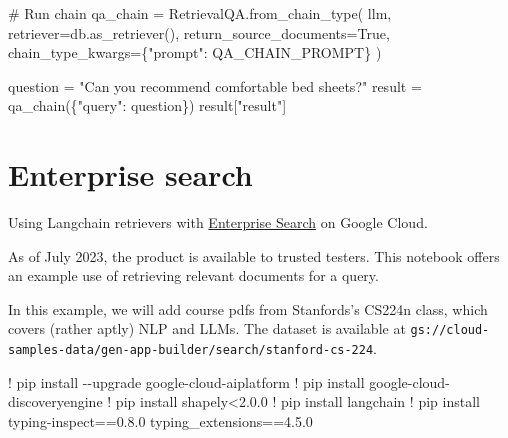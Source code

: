 \documentclass[
  letterpaper,
  DIV=11,
  numbers=noendperiod]{scrreprt}
\newenvironment{Shaded}{\begin{snugshade}}{\end{snugshade}}
\newcommand{\CommentTok}[1]{\textcolor[rgb]{0.37,0.37,0.37}{#1}}
\newcommand{\FloatTok}[1]{\textcolor[rgb]{0.68,0.00,0.00}{#1}}
\newcommand{\NormalTok}[1]{\textcolor[rgb]{0.00,0.23,0.31}{#1}}
\newcommand{\OperatorTok}[1]{\textcolor[rgb]{0.37,0.37,0.37}{#1}}
\newcommand{\StringTok}[1]{\textcolor[rgb]{0.13,0.47,0.30}{#1}}
\newcommand{\VariableTok}[1]{\textcolor[rgb]{0.07,0.07,0.07}{#1}}
\begin{document}
\begin{Shaded}
\begin{Highlighting}[]
\CommentTok{\# Run chain}
\NormalTok{qa\_chain }\OperatorTok{=}\NormalTok{ RetrievalQA.from\_chain\_type(}
\NormalTok{    llm,}
\NormalTok{    retriever}\OperatorTok{=}\NormalTok{db.as\_retriever(),}
\NormalTok{    return\_source\_documents}\OperatorTok{=}\VariableTok{True}\NormalTok{,}
\NormalTok{    chain\_type\_kwargs}\OperatorTok{=}\NormalTok{\{}\StringTok{"prompt"}\NormalTok{: QA\_CHAIN\_PROMPT\}}
\NormalTok{)}
\end{Highlighting}
\end{Shaded}

\begin{Shaded}
\begin{Highlighting}[]
\NormalTok{question }\OperatorTok{=} \StringTok{"Can you recommend comfortable bed sheets?"}
\NormalTok{result }\OperatorTok{=}\NormalTok{ qa\_chain(\{}\StringTok{"query"}\NormalTok{: question\})}
\NormalTok{result[}\StringTok{"result"}\NormalTok{]}
\end{Highlighting}
\end{Shaded}

\hypertarget{enterprise-search}{%
\chapter{Enterprise search}\label{enterprise-search}}

Using Langchain retrievers with
\href{https://cloud.google.com/enterprise-search}{Enterprise Search} on
Google Cloud.

As of July 2023, the product is available to trusted testers. This
notebook offers an example use of retrieving relevant documents for a
query.

In this example, we will add course pdfs from Stanfords's CS224n class,
which covers (rather aptly) NLP and LLMs. The dataset is available at
\texttt{gs://cloud-samples-data/gen-app-builder/search/stanford-cs-224}.

\begin{Shaded}
\begin{Highlighting}[]
\OperatorTok{!}\NormalTok{ pip install }\OperatorTok{{-}{-}}\NormalTok{upgrade google}\OperatorTok{{-}}\NormalTok{cloud}\OperatorTok{{-}}\NormalTok{aiplatform}
\OperatorTok{!}\NormalTok{ pip install google}\OperatorTok{{-}}\NormalTok{cloud}\OperatorTok{{-}}\NormalTok{discoveryengine}
\OperatorTok{!}\NormalTok{ pip install shapely}\OperatorTok{\textless{}}\FloatTok{2.0.0}
\OperatorTok{!}\NormalTok{ pip install langchain}
\OperatorTok{!}\NormalTok{ pip install typing}\OperatorTok{{-}}\NormalTok{inspect}\OperatorTok{==}\FloatTok{0.8.0}\NormalTok{ typing\_extensions}\OperatorTok{==}\FloatTok{4.5.0}
\end{Highlighting}
\end{Shaded}
\end{document}
